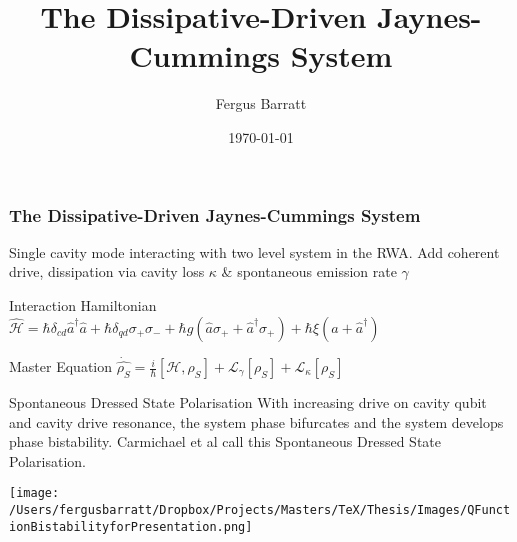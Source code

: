 \documentclass{beamer}
\title{The Dissipative-Driven Jaynes-Cummings System}
\date{\today}
\author{Fergus Barratt}
\begin{document}
\maketitle
\begin{frame}
        \frametitle{The Dissipative-Driven Jaynes-Cummings System}

        \begin{center}
\end{center}
Single cavity mode interacting with two level system in the RWA. Add coherent drive, dissipation via cavity loss $\kappa$ \& spontaneous emission rate $\gamma$
        \begin{block}{Interaction Hamiltonian}
                $\hat{\mathscr{H}} = \hbar \delta_{cd} \hat{a}^\dagger \hat{a} + \hbar \delta_{qd}\sigma_+ \sigma_- + \hbar g ( \hat{a} \sigma_+ + \hat{a}^\dagger \sigma_+ ) + \hbar \xi (\hat{a} + \hat{a}^\dagger) $
        \end{block}
        \begin{block}{Master Equation}
                $\dot{\hat{\rho_S}} = \frac{i}{\hbar} [ \mathscr{H}, \rho_S] + \mathscr{L}_{\gamma} [\rho_S] + \mathscr{L}_{\kappa}[\rho_S]$
        \end{block}
\end{frame}
\begin{frame}{Spontaneous Dressed State Polarisation}
 With increasing drive on cavity qubit and cavity drive resonance, the system phase bifurcates and the system develops phase bistability. Carmichael et al call this Spontaneous Dressed State Polarisation.

 \texttt{[image: /Users/fergusbarratt/Dropbox/Projects/Masters/TeX/Thesis/Images/QFunctionBistabilityforPresentation.png]}         
\end{frame}        
\end{document}
